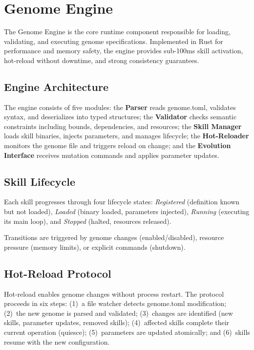 \documentclass[conference]{IEEEtran}
\begin{document}

\section{Genome Engine}
\label{sec:genome_engine}

The Genome Engine is the core runtime component responsible for loading, validating, and executing genome specifications. Implemented in Rust for performance and memory safety, the engine provides sub-100ms skill activation, hot-reload without downtime, and strong consistency guarantees.

\subsection{Engine Architecture}

The engine consists of five modules: the \textbf{Parser} reads genome.toml, validates syntax, and deserializes into typed structures; the \textbf{Validator} checks semantic constraints including bounds, dependencies, and resources; the \textbf{Skill Manager} loads skill binaries, injects parameters, and manages lifecycle; the \textbf{Hot-Reloader} monitors the genome file and triggers reload on change; and the \textbf{Evolution Interface} receives mutation commands and applies parameter updates.

\subsection{Skill Lifecycle}

Each skill progresses through four lifecycle states: \textit{Registered} (definition known but not loaded), \textit{Loaded} (binary loaded, parameters injected), \textit{Running} (executing its main loop), and \textit{Stopped} (halted, resources released).

Transitions are triggered by genome changes (enabled/disabled), resource pressure (memory limits), or explicit commands (shutdown).

\subsection{Hot-Reload Protocol}

Hot-reload enables genome changes without process restart. The protocol proceeds in six steps: (1)~a file watcher detects genome.toml modification; (2)~the new genome is parsed and validated; (3)~changes are identified (new skills, parameter updates, removed skills); (4)~affected skills complete their current operation (quiesce); (5)~parameters are updated atomically; and (6)~skills resume with the new configuration.
\end{document}

